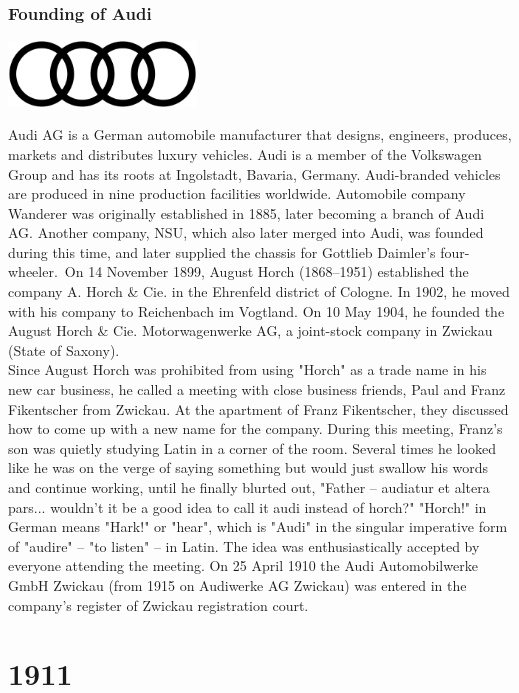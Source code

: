 \documentclass[11pt]{report}
\begin{document}
\subsection{Founding of Audi}
\vspace{2mm}\begin{center}\includegraphics[width=5cm]{./img/audiLogo.jpg}\end{center}
Audi AG is a German automobile manufacturer that designs, engineers, produces, markets and distributes luxury vehicles. Audi is a member of the Volkswagen Group and has its roots at Ingolstadt, Bavaria, Germany. Audi-branded vehicles are produced in nine production facilities worldwide. Automobile company Wanderer was originally established in 1885, later becoming a branch of Audi AG. Another company, NSU, which also later merged into Audi, was founded during this time, and later supplied the chassis for Gottlieb Daimler's four-wheeler.\ On 14 November 1899, August Horch (1868–1951) established the company A. Horch \& Cie. in the Ehrenfeld district of Cologne. In 1902, he moved with his company to Reichenbach im Vogtland. On 10 May 1904, he founded the August Horch \& Cie. Motorwagenwerke AG, a joint-stock company in Zwickau (State of Saxony).\\ \indent Since August Horch was prohibited from using "Horch" as a trade name in his new car business, he called a meeting with close business friends, Paul and Franz Fikentscher from Zwickau. At the apartment of Franz Fikentscher, they discussed how to come up with a new name for the company. During this meeting, Franz's son was quietly studying Latin in a corner of the room. Several times he looked like he was on the verge of saying something but would just swallow his words and continue working, until he finally blurted out, "Father – audiatur et altera pars... wouldn't it be a good idea to call it audi instead of horch?" "Horch!" in German means "Hark!" or "hear", which is "Audi" in the singular imperative form of "audire" – "to listen" – in Latin. The idea was enthusiastically accepted by everyone attending the meeting. On 25 April 1910 the Audi Automobilwerke GmbH Zwickau (from 1915 on Audiwerke AG Zwickau) was entered in the company's register of Zwickau registration court.

\chapter{1911}
\end{document}
